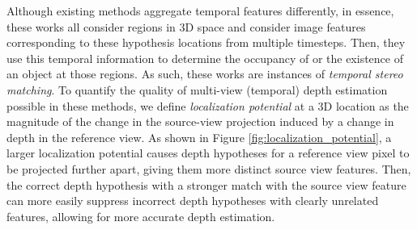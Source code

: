 \documentclass[runningheads, hyperfootnotes=false]{article}
\begin{document}
Although existing methods aggregate temporal features differently, in essence, these works all consider regions in 3D space and consider image features corresponding to these hypothesis locations from multiple timesteps. Then, they use this temporal information to determine the occupancy of or the existence of an object at those regions. As such, these works are instances of \textit{temporal stereo matching}. To quantify the quality of multi-view (temporal) depth estimation possible in these methods, we define \textit{localization potential} at a 3D location as the magnitude of the change in the source-view projection induced by a change in depth in the reference view. As shown in Figure \ref{fig:localization_potential}, a larger localization potential causes depth hypotheses \cite{yao2018mvsnet} for a reference view pixel to be projected further apart, giving them more distinct source view features. Then, the correct depth hypothesis with a stronger match with the source view feature can more easily suppress incorrect depth hypotheses with clearly unrelated features, allowing for more accurate depth estimation.
\end{document}

